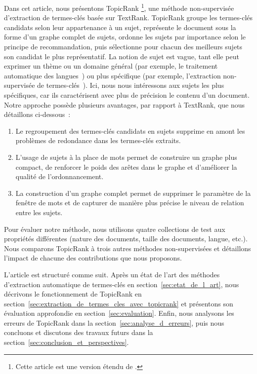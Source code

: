   Dans cet article, nous présentons TopicRank \footnote{Cette article est une
  version étendu de \cite{bougouin2013topicrank}.}, une méthode non-supervisée
  d'extraction de termes-clés basée sur TextRank. TopicRank groupe les
  termes-clés candidats selon leur appartenance à un sujet, représente le
  document sous la forme d'un graphe complet de sujets, ordonne les sujets par
  importance selon le principe de recommandation, puis sélectionne pour chacun
  des meilleurs sujets son candidat le plus représentatif. La notion de sujet
  est vague, tant elle peut exprimer un thème ou un domaine général (par
  exemple, \og le traitement automatique des langues~\fg) ou plus spécifique
  (par exemple, \og l'extraction non-supervisée de termes-clés~\fg). Ici, nous
  nous intéressons aux sujets les plus spécifiques, car ils caractérisent avec
  plus de précision le contenu d'un document. Notre approche possède plusieurs
  avantages, par rapport à TextRank, que nous détaillons ci-dessous~:
  \begin{enumerate}
    \item{Le regroupement des termes-clés candidats en sujets supprime en amont
          les problèmes de redondance dans les termes-clés extraits.}
    \item{L'usage de sujets à la place de mots permet de construire un graphe
          plus compact, de renforcer le poids des arêtes dans le graphe et
          d'améliorer la qualité de l'ordonnancement.}
    \item{La construction d'un graphe complet permet de supprimer le paramètre
          de la fenêtre de mots et de capturer de manière plus précise le niveau
          de relation entre les sujets.}
  \end{enumerate}

  Pour évaluer notre méthode, nous utilisons quatre collections de test aux
  propriétés différentes (nature des documents, taille des documents, langue,
  etc.). Nous comparons TopicRank à trois autres méthodes non-supervisées et
  détaillons l'impact de chacune des contributions que nous proposons.

  L'article est structuré comme suit. Après un état de l'art des méthodes
  d'extraction automatique de termes-clés en section~\ref{sec:etat_de_l_art},
  nous décrivons le fonctionnement de TopicRank en
  section~\ref{sec:extraction_de_termes_cles_avec_topicrank} et présentons son
  évaluation approfondie en section~\ref{sec:evaluation}. Enfin, nous analysons
  les erreurs de TopicRank dans la section~\ref{sec:analyse_d_erreurs}, puis
  nous concluons et discutons des travaux futurs dans la
  section~\ref{sec:conclusion_et_perspectives}.
